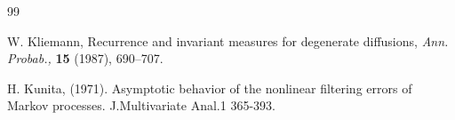 \documentclass[12pt]{amsart}
\theoremstyle{remark}
\numberwithin{equation}{section}
\numberwithin{equation}{section}
\newcommand{\1}{\boldsymbol{1}}
\begin{document}
\begin{thebibliography}{99}
{%










 W. Kliemann,  Recurrence and invariant measures for degenerate diffusions, {\it Ann. Probab.,} {\bf 15} (1987),
690--707.


 H.
Kunita,  (1971).
Asymptotic behavior of the nonlinear filtering errors of Markov processes.
J.Multivariate Anal.1 365-393.


}
\end{thebibliography}
\end{document}
